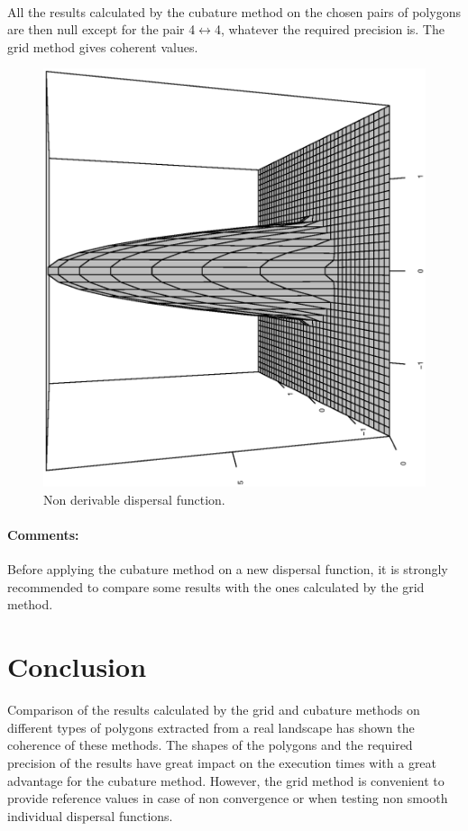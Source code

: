 \paragraph{}
All the results calculated by the cubature method on the chosen
pairs of polygons are then null except for
 the pair 4$\leftrightarrow$4,
whatever the required precision is.
The grid method gives coherent values.

\begin{figure}
  \begin{center}
    \includegraphics[angle=-90, width=15cm]{./VignetteDir/graphics/chapExample/f5.eps}
  \end{center}
\caption{Non derivable dispersal function.}\label{fig:f5}
\end{figure}

\paragraph{Comments:}
Before applying
the cubature method on a new dispersal function,
it  is strongly recommended to compare some results
with the ones calculated by the grid method.


\section{Conclusion}
Comparison of the results calculated by the grid and cubature methods
on  different types of polygons extracted from a real landscape
has shown the coherence of these methods.
The shapes of the polygons and the required
precision of the results have great impact on the execution times
with a great advantage for the cubature method.
However, the grid method is convenient to provide reference values
in case of non convergence or 
when testing  non smooth individual dispersal functions.


